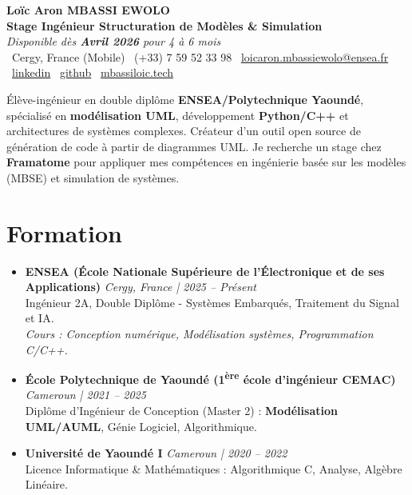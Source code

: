 \documentclass[a4paper,11pt]{article}
\begin{document}
\begin{center}
    {\Large \textbf{Loïc Aron MBASSI EWOLO}} \\ \vspace{4pt}
    \textbf{\large Stage Ingénieur Structuration de Modèles \& Simulation} \\
    \textit{\small Disponible dès \textbf{Avril 2026} pour 4 à 6 mois} \\ \vspace{4pt}
    \small
    \faMapMarker\ Cergy, France (Mobile) \quad
    \faPhone\ (+33) 7 59 52 33 98 \quad
    \faEnvelope\ \href{mailto:loicaron.mbassiewolo@ensea.fr}{loicaron.mbassiewolo@ensea.fr} \\ \vspace{2pt}
    \faLinkedin\ \href{https://www.linkedin.com/in/loic-aron-mbassi-ewolo-3942a9246/}{linkedin} \quad
    \faGithub\ \href{https://github.com/Nameless0l}{github} \quad
    \faGlobe\ \href{https://mbassiloic.tech}{mbassiloic.tech}
\end{center}

\vspace{-6pt}

\noindent\small{Élève-ingénieur en double diplôme \textbf{ENSEA/Polytechnique Yaoundé}, spécialisé en \textbf{modélisation UML}, développement \textbf{Python/C++} et architectures de systèmes complexes. Créateur d'un outil open source de génération de code à partir de diagrammes UML. Je recherche un stage chez \textbf{Framatome} pour appliquer mes compétences en ingénierie basée sur les modèles (MBSE) et simulation de systèmes.}

\section{Formation}
\begin{itemize}[leftmargin=*, label=\tiny$\bullet$, nosep]
    \item \textbf{ENSEA (École Nationale Supérieure de l'Électronique et de ses Applications)} \hfill \textit{Cergy, France | 2025 -- Présent} \\
    \small{Ingénieur 2A, Double Diplôme - Systèmes Embarqués, Traitement du Signal et IA.} \\
    \textit{\small{Cours : Conception numérique, Modélisation systèmes, Programmation C/C++.}}
    \vspace{2pt}
    \item \textbf{École Polytechnique de Yaoundé (1\textsuperscript{ère} école d'ingénieur CEMAC)} \hfill \textit{Cameroun | 2021 -- 2025} \\
    \small{Diplôme d'Ingénieur de Conception (Master 2) : \textbf{Modélisation UML/AUML}, Génie Logiciel, Algorithmique.}
    \item \textbf{Université de Yaoundé I} \hfill \textit{Cameroun | 2020 -- 2022} \\
    \small{Licence Informatique \& Mathématiques : Algorithmique C, Analyse, Algèbre Linéaire.}
\end{itemize}
\end{document}
